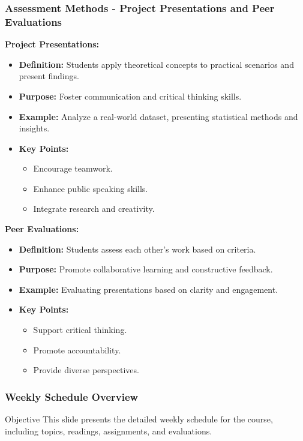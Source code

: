 \documentclass[aspectratio=169]{beamer}
\begin{document}
\begin{frame}[fragile]
    \frametitle{Assessment Methods - Project Presentations and Peer Evaluations}
    \textbf{Project Presentations:}
    \begin{itemize}
        \item \textbf{Definition:} Students apply theoretical concepts to practical scenarios and present findings.
        \item \textbf{Purpose:} Foster communication and critical thinking skills.
        \item \textbf{Example:} Analyze a real-world dataset, presenting statistical methods and insights.
        \item \textbf{Key Points:}
        \begin{itemize}
            \item Encourage teamwork.
            \item Enhance public speaking skills.
            \item Integrate research and creativity.
        \end{itemize}
    \end{itemize}

    \textbf{Peer Evaluations:}
    \begin{itemize}
        \item \textbf{Definition:} Students assess each other’s work based on criteria.
        \item \textbf{Purpose:} Promote collaborative learning and constructive feedback.
        \item \textbf{Example:} Evaluating presentations based on clarity and engagement.
        \item \textbf{Key Points:}
        \begin{itemize}
            \item Support critical thinking.
            \item Promote accountability.
            \item Provide diverse perspectives.
        \end{itemize}
    \end{itemize}
\end{frame}

\begin{frame}[fragile]
    \frametitle{Weekly Schedule Overview}
    \begin{block}{Objective}
        This slide presents the detailed weekly schedule for the course, including topics, readings, assignments, and evaluations.
    \end{block}
\end{frame}
\end{document}

